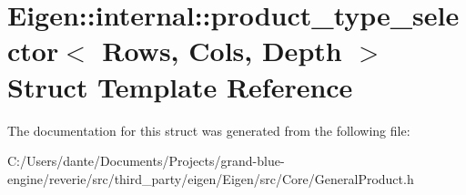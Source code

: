 \hypertarget{struct_eigen_1_1internal_1_1product__type__selector}{}\section{Eigen\+::internal\+::product\+\_\+type\+\_\+selector$<$ Rows, Cols, Depth $>$ Struct Template Reference}
\label{struct_eigen_1_1internal_1_1product__type__selector}


The documentation for this struct was generated from the following file\+:\begin{DoxyCompactItemize}
\item 
C\+:/\+Users/dante/\+Documents/\+Projects/grand-\/blue-\/engine/reverie/src/third\+\_\+party/eigen/\+Eigen/src/\+Core/General\+Product.\+h\end{DoxyCompactItemize}
